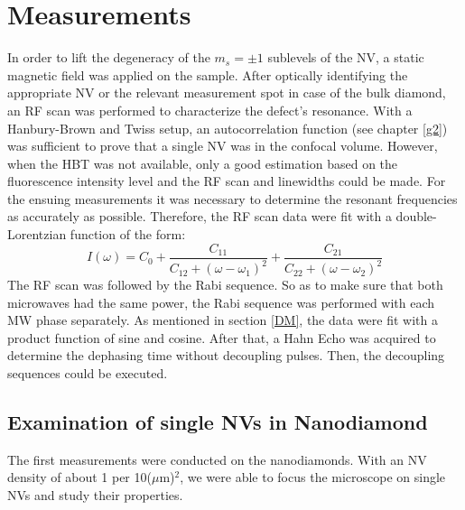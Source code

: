 \documentclass[12pt,a4paper]{article}
\begin{document}
\section{Measurements}
In order to lift the degeneracy of the $m_s=\pm1$ sublevels of the NV, a static magnetic field was applied on the sample. After optically identifying the appropriate NV or the relevant measurement spot in case of the bulk diamond, an RF scan was performed to characterize the defect's resonance. With a Hanbury-Brown and Twiss setup, an autocorrelation function (see chapter \ref{g2}) was sufficient to prove that a single NV was in the confocal volume. However, when the HBT was not available, only a good estimation based on the fluorescence intensity level and the RF scan and linewidths could be made.
 For the ensuing measurements it was necessary to determine the resonant frequencies as accurately as possible. Therefore, the RF scan data were fit with a double-Lorentzian function of the form:
\begin{equation}
I(\omega)=C_0+\frac{C_{11}}{C_{12}+(\omega-\omega_1)^2}+ \frac{C_{21}}{C_{22}+(\omega-\omega_2)^2}
\end{equation}  
The RF scan was followed by the Rabi sequence. So as to make sure that both microwaves had the same power, the Rabi sequence was performed with each MW phase separately. As mentioned in section \ref{DM}, the data were fit with a product function of sine and cosine. After that, a Hahn Echo was acquired to determine the dephasing time without decoupling pulses. Then, the decoupling sequences could be executed. 
\subsection{Examination of single NVs in Nanodiamond}
The first measurements were conducted on the nanodiamonds. With an NV density of about 1 per 10($\mu$m)$^2$, we were able to focus the microscope on single NVs and study their properties.
\end{document}
